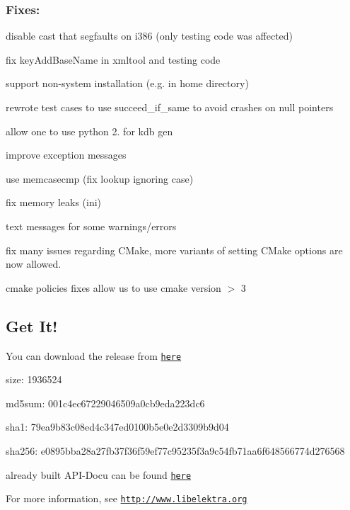 \subsubsection*{Fixes\+:}


\begin{DoxyItemize}
\item disable cast that segfaults on i386 (only testing code was affected)
\item fix key\+Add\+Base\+Name in xmltool and testing code
\item support non-\/system installation (e.\+g. in home directory)
\item rewrote test cases to use succeed\+\_\+if\+\_\+same to avoid crashes on null pointers
\item allow one to use python 2. for kdb gen
\item improve exception messages
\item use memcasecmp (fix lookup ignoring case)
\item fix memory leaks (ini)
\item text messages for some warnings/errors
\item fix many issues regarding C\+Make, more variants of setting C\+Make options are now allowed.
\item cmake policies fixes allow us to use cmake version $>$ 3
\end{DoxyItemize}

\subsection*{Get It!}

You can download the release from \href{http://www.markus-raab.org/ftp/elektra/releases/elektra-0.8.9.tar.gz}{\tt here}


\begin{DoxyItemize}
\item size\+: 1936524
\item md5sum\+: 001c4ec67229046509a0cb9eda223dc6
\item sha1\+: 79ea9b83c08ed4c347ed0100b5e0e2d3309b9d04
\item sha256\+: e0895bba28a27fb37f36f59ef77c95235f3a9c54fb71aa6f648566774d276568
\end{DoxyItemize}

already built A\+P\+I-\/\+Docu can be found \href{http://doc.libelektra.org/api/0.8.9/html/}{\tt here}

For more information, see \href{http://www.libelektra.org}{\tt http\+://www.\+libelektra.\+org}

